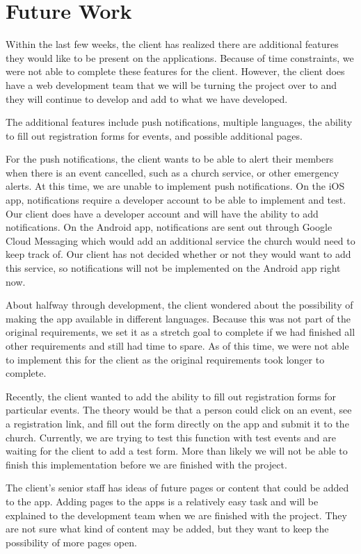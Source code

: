 \documentclass[letterpaper,10pt,draftclsnofoot,onecolumn,titlepage]{IEEEtran}
\begin{document}
\section{Future Work}
		Within the last few weeks, the client has realized there are additional features they would like to be present on the applications. 
		Because of time constraints, we were not able to complete these features for the client. 
		However, the client does have a web development team that we will be turning the project over to and they will continue to develop and add to what we have developed. 
		
		The additional features include push notifications, multiple languages, the ability to fill out registration forms for events, and possible additional pages. 
		
		For the push notifications, the client wants to be able to alert their members when there is an event cancelled, such as a church service, or other emergency alerts. 
		At this time, we are unable to implement push notifications. 
		On the iOS app, notifications require a developer account to be able to implement and test. 
		Our client does have a developer account and will have the ability to add notifications. 
		On the Android app, notifications are sent out through Google Cloud Messaging which would add an additional service the church would need to keep track of. 
		Our client has not decided whether or not they would want to add this service, so notifications will not be implemented on the Android app right now. 
		
		About halfway through development, the client wondered about the possibility of making the app available in different languages. 
		Because this was not part of the original requirements, we set it as a stretch goal to complete if we had finished all other requirements and still had time to spare. 
		As of this time, we were not able to implement this for the client as the original requirements took longer to complete. 
		
		Recently, the client wanted to add the ability to fill out registration forms for particular events. 
		The theory would be that a person could click on an event, see a registration link, and fill out the form directly on the app and submit it to the church. 
		Currently, we are trying to test this function with test events and are waiting for the client to add a test form. 
		More than likely we will not be able to finish this implementation before we are finished with the project. 
		
		The client's senior staff has ideas of future pages or content that could be added to the app. 
		Adding pages to the apps is a relatively easy task and will be explained to the development team when we are finished with the project. 
		They are not sure what kind of content may be added, but they want to keep the possibility of more pages open.
		
	




	
\end{document}

